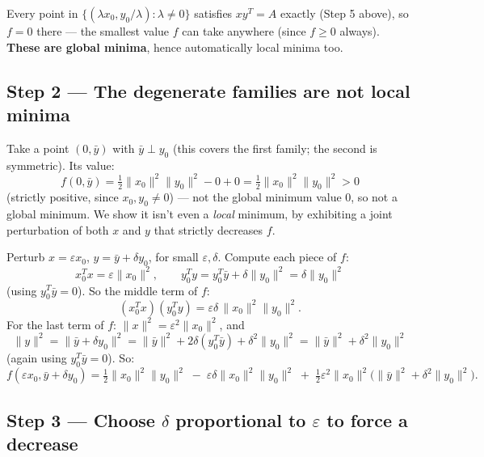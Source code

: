 \documentclass[11pt]{article}
\begin{document}
Every point in $\{(\lambda x_0,y_0/\lambda):\lambda\ne0\}$ satisfies $xy^T=A$ exactly (Step 5 above), so $f=0$ there --- the smallest value $f$ can take anywhere (since $f\ge0$ always). \textbf{These are global minima}, hence automatically local minima too.

\subsection*{Step 2 --- The degenerate families are not local minima}

Take a point $(0,\bar y)$ with $\bar y\perp y_0$ (this covers the first family; the second is symmetric). Its value:
\[
f(0,\bar y) = \tfrac12\|x_0\|^2\|y_0\|^2 - 0 + 0 = \tfrac12\|x_0\|^2\|y_0\|^2 > 0
\]
(strictly positive, since $x_0,y_0\ne0$) --- not the global minimum value $0$, so not a global minimum. We show it isn't even a \emph{local} minimum, by exhibiting a joint perturbation of both $x$ and $y$ that strictly decreases $f$.

Perturb $x=\varepsilon x_0$, $y = \bar y+\delta y_0$, for small $\varepsilon,\delta$. Compute each piece of $f$:
\[
x_0^Tx = \varepsilon\|x_0\|^2, \qquad y_0^Ty = y_0^T\bar y+\delta\|y_0\|^2 = \delta\|y_0\|^2
\]
(using $y_0^T\bar y=0$). So the middle term of $f$:
\[
(x_0^Tx)(y_0^Ty) = \varepsilon\delta\,\|x_0\|^2\|y_0\|^2.
\]
For the last term of $f$: $\|x\|^2=\varepsilon^2\|x_0\|^2$, and
\[
\|y\|^2 = \|\bar y+\delta y_0\|^2 = \|\bar y\|^2 + 2\delta(y_0^T\bar y) + \delta^2\|y_0\|^2 = \|\bar y\|^2+\delta^2\|y_0\|^2
\]
(again using $y_0^T\bar y=0$). So:
\[
f(\varepsilon x_0,\bar y+\delta y_0) = \tfrac12\|x_0\|^2\|y_0\|^2 \;-\; \varepsilon\delta\|x_0\|^2\|y_0\|^2 \;+\; \tfrac12\varepsilon^2\|x_0\|^2\big(\|\bar y\|^2+\delta^2\|y_0\|^2\big).
\]

\subsection*{Step 3 --- Choose $\delta$ proportional to $\varepsilon$ to force a decrease}
\end{document}

